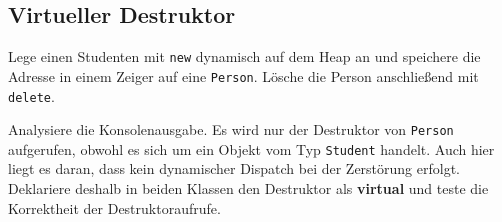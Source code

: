 \subsection{Virtueller Destruktor}
Lege einen Studenten mit \lstinline{new} dynamisch auf dem Heap an und speichere die Adresse in einem Zeiger auf eine \lstinline{Person}.
Lösche die Person anschließend mit \lstinline{delete}.


Analysiere die Konsolenausgabe.
Es wird nur der Destruktor von \lstinline{Person} aufgerufen, obwohl es sich um ein Objekt vom Typ \lstinline{Student} handelt.
Auch hier liegt es daran, dass kein dynamischer Dispatch bei der Zerstörung erfolgt.
Deklariere deshalb in beiden Klassen den Destruktor als \textbf{virtual} und teste die Korrektheit der Destruktoraufrufe.

